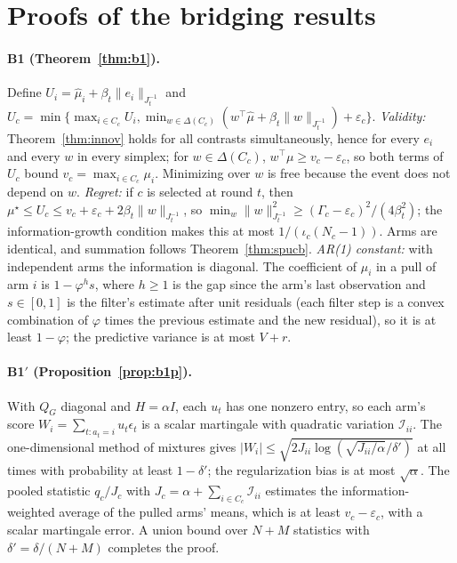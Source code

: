 \documentclass[11pt]{article}
\theoremstyle{definition}
\theoremstyle{remark}
\newcommand{\I}{\mathcal{I}}
\begin{document}
\appendix

\section{Proofs of the bridging results}\label{app:proofs}

\paragraph{B1 (Theorem~\ref{thm:b1}).} Define $U_i=\hat\mu_i+\beta_t\|e_i\|_{J_t^{-1}}$ and $U_c=\min\{\max_{i\in C_c}U_i,\min_{w\in\Delta(C_c)}(w^\top\hat\mu+\beta_t\|w\|_{J_t^{-1}})+\varepsilon_c\}$. \emph{Validity:} Theorem~\ref{thm:innov} holds for all contrasts simultaneously, hence for every $e_i$ and every $w$ in every simplex; for $w\in\Delta(C_c)$, $w^\top\mu\ge v_c-\varepsilon_c$, so both terms of $U_c$ bound $v_c=\max_{i\in C_c}\mu_i$. Minimizing over $w$ is free because the event does not depend on $w$. \emph{Regret:} if $c$ is selected at round $t$, then $\mu^\star\le U_c\le v_c+\varepsilon_c+2\beta_t\|w\|_{J_t^{-1}}$, so $\min_w\|w\|^2_{J_t^{-1}}\ge(\Gamma_c-\varepsilon_c)^2/(4\beta_t^2)$; the information-growth condition makes this at most $1/(\iota_c(N_c-1))$. Arms are identical, and summation follows Theorem~\ref{thm:spucb}. \emph{AR(1) constant:} with independent arms the information is diagonal. The coefficient of $\mu_i$ in a pull of arm $i$ is $1-\varphi^hs$, where $h\ge1$ is the gap since the arm's last observation and $s\in[0,1]$ is the filter's estimate after unit residuals (each filter step is a convex combination of $\varphi$ times the previous estimate and the new residual), so it is at least $1-\varphi$; the predictive variance is at most $V+r$.

\paragraph{B1$'$ (Proposition~\ref{prop:b1p}).} With $Q_G$ diagonal and $H=\alpha I$, each $u_t$ has one nonzero entry, so each arm's score $W_i=\sum_{t:a_t=i}u_t\epsilon_t$ is a scalar martingale with quadratic variation $\I_{ii}$. The one-dimensional method of mixtures gives $|W_i|\le\sqrt{2J_{ii}\log(\sqrt{J_{ii}/\alpha}/\delta')}$ at all times with probability at least $1-\delta'$; the regularization bias is at most $\sqrt\alpha$. The pooled statistic $q_c/J_c$ with $J_c=\alpha+\sum_{i\in C_c}\I_{ii}$ estimates the information-weighted average of the pulled arms' means, which is at least $v_c-\varepsilon_c$, with a scalar martingale error. A union bound over $N+M$ statistics with $\delta'=\delta/(N+M)$ completes the proof.
\end{document}

